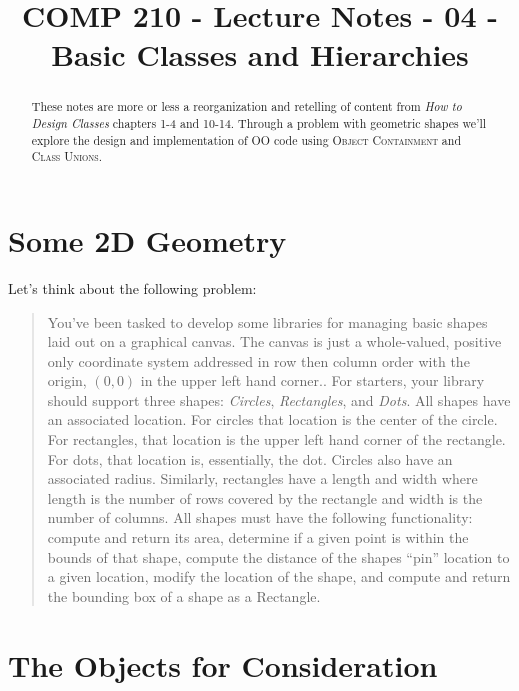 \documentclass[]{tufte-handout}
\title{COMP 210 - Lecture Notes - 04 - Basic Classes and Hierarchies}
\begin{document}
\maketitle

\begin{abstract}
These notes are more or less a reorganization and retelling of content from \textit{How to Design Classes} chapters 1-4 and 10-14. Through a problem with geometric shapes we'll explore the design and implementation of OO code using \textsc{Object Containment} and \textsc{Class Unions}.   
\end{abstract}

\section{Some 2D Geometry}

Let's think about the following problem:
\begin{quote}
You've been tasked to develop some libraries for managing basic shapes laid out on a graphical canvas. The canvas is just a whole-valued, positive only coordinate system addressed in row then column order with the origin, $(0,0)$ in the upper left hand corner.. For starters, your library should support three shapes: \textit{Circles}, \textit{Rectangles}, and \textit{Dots}. All shapes have an associated location. For circles that location is the center of the circle. For rectangles, that location is the upper left hand corner of the rectangle. For dots, that location is, essentially, the dot. Circles also have an associated radius. Similarly, rectangles have a length and width where length is the number of rows covered by the rectangle and width is the number of columns.  
All shapes must have the following functionality: compute and return its area, determine if a given point is within the bounds of that shape, compute the distance of the shapes ``pin'' location to a given location, modify the location of the shape, and compute and return the bounding box of a shape as a Rectangle.
\end{quote}

\section{The Objects for Consideration}
\end{document}
